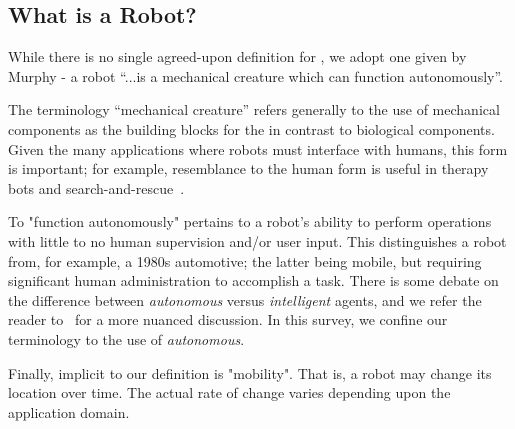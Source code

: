 \subsection{What is a Robot?}

While there is no single agreed-upon definition for , we adopt one given by Murphy - a robot ``...is a mechanical creature which can function autonomously''.





The terminology ``mechanical creature'' refers generally to the use of mechanical components as the building blocks for the  in contrast to biological components. Given the many applications where robots must interface with humans, this form is important; for example, resemblance to the human form is useful in therapy bots and search-and-rescue~\cite{Shin2017}. 

To "function autonomously" pertains to a robot's ability to perform operations with little to no human supervision and/or user input. This distinguishes a robot from, for example, a 1980s automotive; the latter being mobile, but requiring significant human administration to accomplish a task. There is some debate on the difference between {\it autonomous} versus {\it intelligent} agents, and we refer the reader to~\cite{} for a more nuanced discussion. In this survey, we confine our terminology to the use of {\it autonomous}.

Finally, implicit to our definition is "mobility". That is, a robot may change its location over time. The actual rate of change varies depending upon the application domain. 


